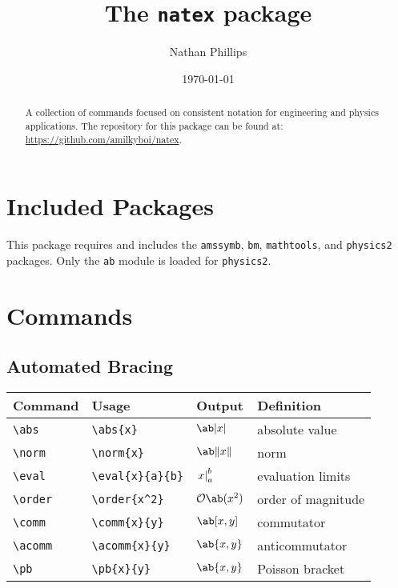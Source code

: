 \documentclass[11pt]{article}
\title{The \texttt{natex} package}
\author{Nathan Phillips}
\date{\today}
\begin{document}
\maketitle

\begin{abstract}
    A collection of commands focused on consistent notation for engineering and physics applications. The repository for this package can be found at: \url{https://github.com/amilkyboi/natex}.
\end{abstract}

\tableofcontents

\newpage
\section{Included Packages}

This package requires and includes the \verb|amssymb|, \verb|bm|, \verb|mathtools|, and \verb|physics2| packages. Only the \verb|ab| module is loaded for \verb|physics2|.

\newpage
\section{Commands}

\subsection{Automated Bracing}

\begin{tabular}{llll}
    Command       & Usage                 & Output           & Definition         \\
    \hline
    \verb|\abs|   & \verb|\abs{x}|        & $\abs{x}$        & absolute value     \\
    \verb|\norm|  & \verb|\norm{x}|       & $\norm{x}$       & norm               \\
    \verb|\eval|  & \verb|\eval{x}{a}{b}| & $\left.x\right\rvert_{a}^{b}$ & evaluation limits  \\
    \verb|\order| & \verb|\order{x^2}|    & $\order{x^2}$    & order of magnitude \\
    \verb|\comm|  & \verb|\comm{x}{y}|    & $\comm{x}{y}$    & commutator         \\
    \verb|\acomm| & \verb|\acomm{x}{y}|   & $\acomm{x}{y}$   & anticommutator     \\
    \verb|\pb|    & \verb|\pb{x}{y}|      & $\pb{x}{y}$      & Poisson bracket    \\
\end{tabular}
\end{document}
